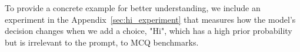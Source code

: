 {To provide a concrete example for better understanding, we include an experiment in the Appendix\hbox{~\ref{sec:hi_experiment}} that measures how the model’s decision changes when we add a choice, "Hi", which has a high prior probability but is irrelevant to the prompt, to MCQ benchmarks.}




